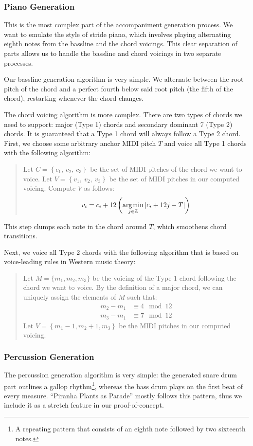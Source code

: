 \subsubsection{Piano Generation}

This is the most complex part of the accompaniment generation process. We want to emulate the style of stride piano, which involves playing alternating eighth notes from the bassline and the chord voicings. This clear separation of parts allows us to handle the bassline and chord voicings in two separate processes.

Our bassline generation algorithm is very simple. We alternate between the root pitch of the chord and a perfect fourth below said root pitch (the fifth of the chord), restarting whenever the chord changes.

The chord voicing algorithm is more complex. There are two types of chords we need to support: major (Type 1) chords and secondary dominant 7 (Type 2) chords. It is guaranteed that a Type 1 chord will always follow a Type 2 chord. First, we choose some arbitrary anchor MIDI pitch $T$ and voice all Type 1 chords with the following algorithm:
\begin{quote}
    Let $C = \left\{ c_1, \ c_2, \ c_3 \right\}$ be the set of MIDI pitches of the chord we want to voice.
    Let $V = \left\{ v_1, \ v_2, \ v_3 \right\}$ be the set of MIDI pitches in our computed voicing.
    Compute $V$ as follows:
    $$v_i = c_i + 12 \left( \operatorname*{\arg\!\min}_{j \in \mathbb{Z}} \left\lvert c_i + 12j - T \right\rvert \right)$$
\end{quote}
This step clumps each note in the chord around $T$, which smoothens chord transitions.

Next, we voice all Type 2 chords with the following algorithm that is based on voice-leading rules in Western music theory:
\begin{quote}
    Let $M = \{ m_1, m_2, m_3\}$ be the voicing of the Type 1 chord following the chord we want to voice. By the definition of a major chord, we can uniquely assign the elements of $M$ such that:
    \begin{align*}
        m_2 - m_1 &\equiv 4 \mod 12 \\
        m_3 - m_1 &\equiv 7 \mod 12
    \end{align*}
    Let $V = \left\{ m_1 - 1, m_2 + 1, m_3 \right\}$ be the MIDI pitches in our computed voicing.
\end{quote}

\subsubsection{Percussion Generation}

The percussion generation algorithm is very simple: the generated snare drum part outlines a gallop rhythm\footnote{A repeating pattern that consists of an eighth note followed by two sixteenth notes.}, whereas the bass drum plays on the first beat of every measure. ``Piranha Plants as Parade'' mostly follows this pattern, thus we include it as a stretch feature in our proof-of-concept.
